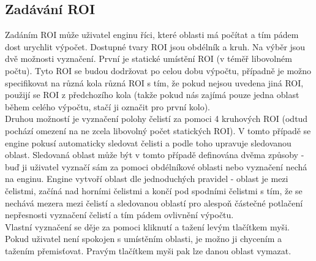 \documentclass[a4paper,12pt]{article}
\begin{document}
\subsection{Zadávání ROI}
\begin{figure}[H]
\end{figure}
Zadáním ROI může uživatel enginu říci, které oblasti má počítat a tím pádem dost urychlit výpočet. Dostupné tvary ROI jsou obdélník a kruh. Na výběr jsou dvě možnosti vyznačení. První je statické umístění ROI (v téměř libovolném počtu). Tyto ROI se budou dodržovat po celou dobu výpočtu, případně je možno specifikovat na různá kola různá ROI s tím, že pokud nejsou uvedena jiná ROI, použijí se ROI z předchozího kola (takže pokud nás zajímá pouze jedna oblast během celého výpočtu, stačí ji označit pro první kolo).\\
Druhou možností je vyznačení polohy čelistí za pomoci 4 kruhových ROI (odtud pochází omezení na ne zcela libovolný počet statických ROI). V tomto případě se engine pokusí automaticky sledovat čelisti a podle toho upravuje sledovanou oblast. Sledovaná oblast může být v tomto případě definována dvěma způsoby - buď ji uživatel vyznačí sám za pomoci obdélníkové oblasti nebo vyznačení nechá na enginu. Engine vytvoří oblast dle jednoduchých pravidel - oblast je mezi čelistmi, začíná nad horními čelistmi a končí pod spodními čelistmi s tím, že se nechává mezera mezi čelistí a sledovanou oblastí pro alespoň částečné potlačení nepřesnosti vyznačení čelistí a tím pádem ovlivnění výpočtu.\\
Vlastní vyznačení se děje za pomoci kliknutí a tažení levým tlačítkem myši. Pokud uživatel není spokojen s umístěním oblasti, je možno ji chycením a tažením přemisťovat. Pravým tlačítkem myši pak lze danou oblast vymazat.
\newpage
\end{document}
